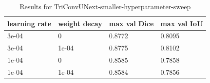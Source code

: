\begin{table}
\caption{Results for TriConvUNext-smaller-hyperparameter-sweep}
\label{tab-TriConvUNext-smaller-hyperparameter-sweep_table}
\begin{tabular}{llll}
\toprule
learning rate & weight decay & max val Dice & max val IoU \\
\midrule
3e-04 & 0 & 0.8772 & 0.8095 \\
3e-04 & 1e-04 & 0.8775 & 0.8102 \\
1e-04 & 0 & 0.8585 & 0.7858 \\
1e-04 & 1e-04 & 0.8584 & 0.7856 \\
\bottomrule
\end{tabular}
\end{table}
